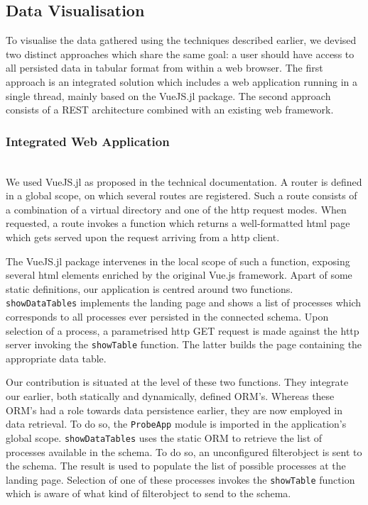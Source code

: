 \documentclass{juliacon}
\begin{document}
\subsection{Data Visualisation}
To visualise the data gathered using the techniques described earlier, we devised two distinct approaches which share the same goal: a user should have access to all persisted data in tabular format from within a web browser. The first approach is an integrated solution which includes a web application running in a single thread, mainly based on the VueJS.jl package. The second approach consists of a REST architecture combined with an existing web framework.\vskip 6pt

\subsubsection{Integrated Web Application}\hfill\\

We used VueJS.jl as proposed in the technical documentation. A router is defined in a global scope, on which several routes are registered. Such a route consists of a combination of a virtual directory and one of the http request modes. When requested, a route invokes a function which returns a well-formatted html page which gets served upon the request arriving from a http client.\vskip 6pt

The VueJS.jl package intervenes in the local scope of such a function, exposing several html elements enriched by the original Vue.js framework. Apart of some static definitions, our application is centred around two functions. \texttt{showDataTables} implements the landing page and shows a list of processes which corresponds to all processes ever persisted in the connected schema. Upon selection of a process, a parametrised http GET request is made against the http server invoking the \texttt{showTable} function. The latter builds the page containing the appropriate data table. \vskip 6pt

Our contribution is situated at the level of these two functions. They integrate our earlier, both statically and dynamically, defined ORM's. Whereas these ORM's had a role towards data persistence earlier, they are  now employed in data retrieval. To do so, the \texttt{ProbeApp} module is imported in the application's global scope. \texttt{showDataTables} uses the static ORM to retrieve the list of processes available in the schema. To do so, an unconfigured filterobject is sent to the schema. The result is used to populate the list of possible processes at the landing page. Selection of one of these processes invokes the \texttt{showTable} function which is aware of what kind of filterobject to send to the schema.\vskip 6pt
\end{document}
